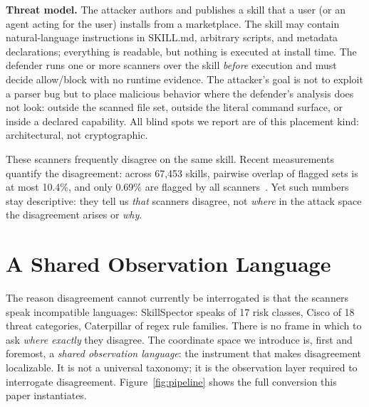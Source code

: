 \documentclass[sigconf,nonacm]{acmart}
\begin{document}
\textbf{Threat model.} The attacker authors and publishes a skill that a user (or an agent acting for the user) installs from a marketplace. The skill may contain natural-language instructions in SKILL.md, arbitrary scripts, and metadata declarations; everything is readable, but nothing is executed at install time. The defender runs one or more scanners over the skill \emph{before} execution and must decide allow/block with no runtime evidence. The attacker's goal is not to exploit a parser bug but to place malicious behavior where the defender's analysis does not look: outside the scanned file set, outside the literal command surface, or inside a declared capability. All blind spots we report are of this placement kind: architectural, not cryptographic.

These scanners frequently disagree on the same skill. Recent measurements quantify the disagreement: across 67{,}453 skills, pairwise overlap of flagged sets is at most 10.4\%, and only 0.69\% are flagged by all scanners~\cite{clawhub2026}. Yet such numbers stay descriptive: they tell us \emph{that} scanners disagree, not \emph{where} in the attack space the disagreement arises or \emph{why}.

\section{A Shared Observation Language}
\label{sec:measure}

The reason disagreement cannot currently be interrogated is that the scanners speak incompatible languages: SkillSpector speaks of 17 risk classes, Cisco of 18 threat categories, Caterpillar of regex rule families. There is no frame in which to ask \emph{where exactly} they disagree. The coordinate space we introduce is, first and foremost, a \emph{shared observation language}: the instrument that makes disagreement localizable. It is not a universal taxonomy; it is the observation layer required to interrogate disagreement. Figure~\ref{fig:pipeline} shows the full conversion this paper instantiates.
\end{document}
